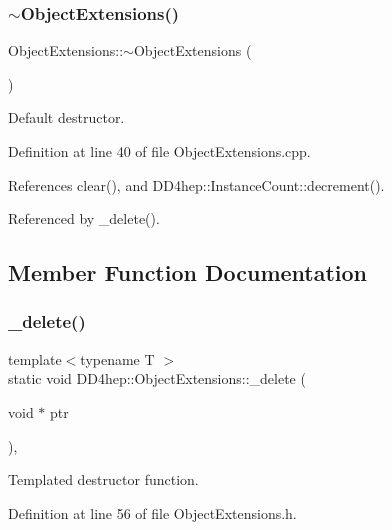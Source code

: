 \subsubsection{\texorpdfstring{$\sim$\+Object\+Extensions()}{~ObjectExtensions()}}
{\footnotesize\ttfamily Object\+Extensions\+::$\sim$\+Object\+Extensions (\begin{DoxyParamCaption}{ }\end{DoxyParamCaption})\hspace{0.3cm}{\ttfamily [virtual]}}



Default destructor. 



Definition at line 40 of file Object\+Extensions.\+cpp.



References clear(), and D\+D4hep\+::\+Instance\+Count\+::decrement().



Referenced by \+\_\+delete().



\subsection{Member Function Documentation}
\hypertarget{class_d_d4hep_1_1_object_extensions_a62415b453a6ea86769c2777c0609eb34}{}\label{class_d_d4hep_1_1_object_extensions_a62415b453a6ea86769c2777c0609eb34} 
\subsubsection{\texorpdfstring{\+\_\+delete()}{\_delete()}}
{\footnotesize\ttfamily template$<$typename T $>$ \\
static void D\+D4hep\+::\+Object\+Extensions\+::\+\_\+delete (\begin{DoxyParamCaption}\item[{void $\ast$}]{ptr }\end{DoxyParamCaption})\hspace{0.3cm}{\ttfamily [inline]}, {\ttfamily [static]}}



Templated destructor function. 



Definition at line 56 of file Object\+Extensions.\+h.



